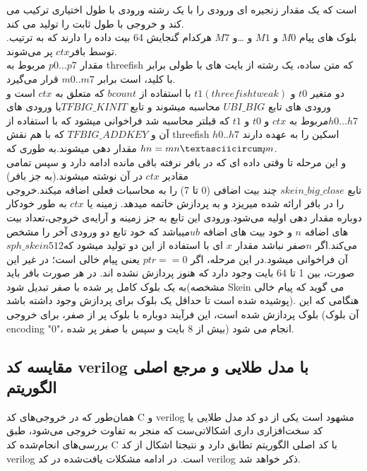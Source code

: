  است که یک مقدار زنجیره ای ورودی را با یک رشته ورودی با طول اختیاری ترکیب می کند و خروجی با طول ثابت را تولید می کند.\\
.بلوک های پیام $M0$ و $M1$ و …و $M7$ هرکدام گنجایش 64 بیت داده را دارند که به ترتیب توسط  بافر$ ctx$ پر می‌شوند.\\
 مقدار $p0…p7$ مربوط به threefish که متن ساده، یک رشته از بایت های با طولی برابر با کلید، است برابر $m0..m7$ قرار می‌گیرد.\\
دو متغیر $t0$ و $t1(threefish tweak)$ با استفاده از $bcount$  که متعلق به $ctx$ است و ورودی های تابع  $UBI\_BIG$ محاسبه میشوند و تابع $TFBIG\_KINIT$با ورودی های $h0 …h7 $مربوط به $ctx$ و $t0$ و $t1$ که قبلتر محاسبه شد فراخوانی میشود که با استفاده از آن و $TFBIG\_ADDKEY$ که با هم نقش  threefish اسکین را به عهده دارند $h0..h7$ مقدار دهی میشوند.به طوری که $hn = mn \textasciicircum pn$.\\
 و این مرحله تا وقتی داده ای که در بافر نرفته باقی  مانده ادامه دارد و سپس تمامی مقادیر $ctx$ در آن نوشته میشوند.(به جز بافر)\\
 تابع  $skein\_big\_close$ چند بیت اضافی (0 تا 7) را به محاسبات فعلی اضافه میکند.خروجی را در بافر ارائه شده میریزد و به پردازش خاتمه میدهد. زمینه یا $ctx$ به طور خودکار دوباره مقدار دهی اولیه می‌شود.ورودی این تابع به جز زمینه و آرایه‌ی خروجی،تعداد بیت های اضافه $n$ و خود بیت های اضافه $ub $میباشد که خود تابع دو ورودی آخر را مشخص می‌کند.اگر $n $صفر نباشد مقدار $x$ ای با استفاده از این دو تولید میشود که$ sph\_skein512$ آن فراخوانی میشود.در این مرحله، اگر $ptr == 0$ یعنی پیام خالی است؛ در غیر این صورت، بین 1 تا 64 بایت وجود دارد که هنوز پردازش نشده اند. در هر صورت بافر باید به یک بلوک کامل پر شده با صفر تبدیل شود(مشخصه Skein می گوید که پیام خالی پوشیده شده است تا حداقل یک بلوک برای پردازش وجود داشته باشد).
  هنگامی که این بلوک پردازش شده است، این فرآیند دوباره با بلوک پر از صفر، برای خروجی (آن بلوک encoding "0"، بیش از 8 بایت و سپس با صفر پر شده) انجام می شود.


\subsection{مقایسه کد verilog با مدل طلایی و مرجع اصلی الگوریتم}
همان‌طور که در خروجی‌های کد C و verilog مشهود است یکی از دو کد مدل طلایی یا کد سخت‌افزاری داری اشکالاتی‌ست که منجر به تفاوت خروجی می‌شود، طبق بررسی‌های انجام‌شده کد C با کد اصلی الگوریتم تطابق دارد و نتیجتا اشکال از کد verilog است. در ادامه مشکلات یافت‌شده در کد verilog ذکر خواهد شد. 
